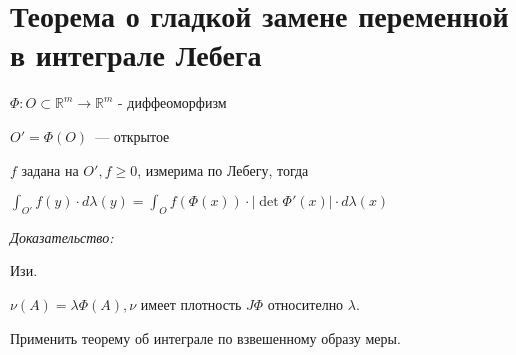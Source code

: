\documentclass[paper=a4, fontsize=17pt]{article}
\begin{document}
\section{Теорема о гладкой замене переменной в интеграле Лебега}
$\Phi: O \subset \mathds{R}^m \rightarrow \mathds{R}^m$ - диффеоморфизм

$O' = \Phi(O)$~--- открытое

$f$ задана на $O', f \geqslant 0$, измерима по Лебегу, тогда

$\int_{O'}f(y) \cdot d \lambda(y) = \int_O f(\Phi(x)) \cdot |\det \Phi'(x)| \cdot d \lambda(x)$

\emph{Доказательство:}

Изи.

$\nu(A) = \lambda \Phi (A), \nu$ имеет плотность $J \Phi$ относително $\lambda$.

Применить теорему об интеграле по взвешенному образу меры.


\end{document}
